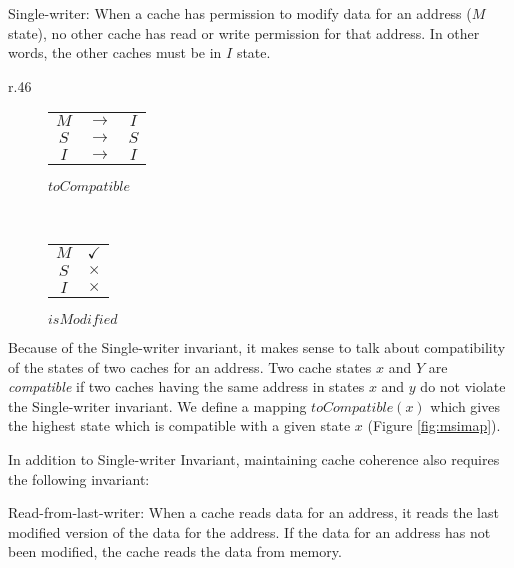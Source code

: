 \begin{inv}
Single-writer: When a cache has permission to modify data for an address ($M$
state), no other cache has read or write permission for that address. In other
words, the other caches must be in $I$ state.
\label{singleWriter}
\end{inv}

\begin{wrapfigure}{r}{.46\linewidth}
\begin{subfigure}{.27\linewidth}
\centering
\begin{tabular}{|ccc|}
\hline
$M$ & $\rightarrow$ & $I$\\
$S$ & $\rightarrow$ & $S$\\
$I$ & $\rightarrow$ & $I$\\
\hline
\end{tabular}
\caption*{$toCompatible$}
\label{toCompat}
\end{subfigure}
~~~~~~~~~~~~~~
\begin{subfigure}{.21\linewidth}
\centering
\begin{tabular}{|c|c|}
\hline
$M$ & $\checkmark$\\
$S$ & $\times$\\
$I$ & $\times$\\
\hline
\end{tabular}
\caption*{$isModified$}
\label{isModified}
\end{subfigure}
\caption{$toCompatible$ and $isModified$ mappings}
\label{fig:msimap}
\end{wrapfigure}

Because of the Single-writer invariant, it makes sense to talk about
compatibility of the states of two caches for an address. Two cache states $x$
and $Y$ are \emph{compatible} if two caches having the same address in states
$x$ and $y$ do not violate the Single-writer invariant. We define a mapping
$toCompatible(x)$ which gives the highest state which is compatible with a given
state $x$ (Figure \ref{fig:msimap}).

In addition to Single-writer Invariant, maintaining cache coherence also
requires the following invariant:

\begin{inv}
Read-from-last-writer: When a cache reads data for an address, it reads the last
modified version of the data for the address. If the data for an address has not
been modified, the cache reads the data from memory.
\end{inv}

